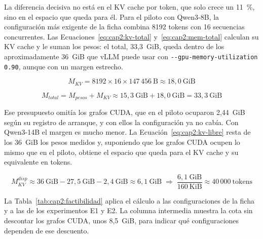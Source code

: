 La diferencia decisiva no está en el KV cache por token, que solo crece un 11~\%, sino en el espacio que queda para él. Para el piloto con Qwen3-8B, la configuración más exigente de la ficha combina 8192 tokens con 16 secuencias concurrentes. Las Ecuaciones~\ref{eq:cap2:kv-total} y~\ref{eq:cap2:mem-total} calculan su KV cache y le suman los pesos: el total, 33,3~GiB, queda dentro de los aproximadamente 36~GiB que vLLM puede usar con \texttt{-{}-gpu-memory-utilization 0.90}, aunque con un margen estrecho.

\begin{equation}
\label{eq:cap2:kv-total}
M_{KV} = 8192 \times 16 \times 147\,456~\mathrm{B} \approx 18{,}0~\mathrm{GiB}
\end{equation}

\begin{equation}
\label{eq:cap2:mem-total}
M_{total} = M_{pesos} + M_{KV} \approx 15{,}3~\mathrm{GiB} + 18{,}0~\mathrm{GiB} = 33{,}3~\mathrm{GiB}
\end{equation}

Ese presupuesto omitía los grafos CUDA, que en el piloto ocuparon 2,44~GiB según su registro de arranque, y con ellos la configuración ya no cabía. Con Qwen3-14B el margen es mucho menor. La Ecuación~\ref{eq:cap2:kv-libre} resta de los 36~GiB los pesos medidos y, suponiendo que los grafos CUDA ocupen lo mismo que en el piloto, obtiene el espacio que queda para el KV cache y su equivalente en tokens.

\begin{equation}
\label{eq:cap2:kv-libre}
M_{KV}^{disp} \approx 36~\mathrm{GiB} - 27{,}5~\mathrm{GiB} - 2{,}4~\mathrm{GiB} \approx 6{,}1~\mathrm{GiB} \;\Rightarrow\; \frac{6{,}1~\mathrm{GiB}}{160~\mathrm{KiB}} \approx 40\,000~\mathrm{tokens}
\end{equation}

La Tabla~\ref{tab:cap2:factibilidad} aplica el cálculo a las configuraciones de la ficha y a las de los experimentos E1 y E2. La columna intermedia muestra la cota sin descontar los grafos CUDA, unos 8,5~GiB, para indicar qué configuraciones dependen de ese descuento.

